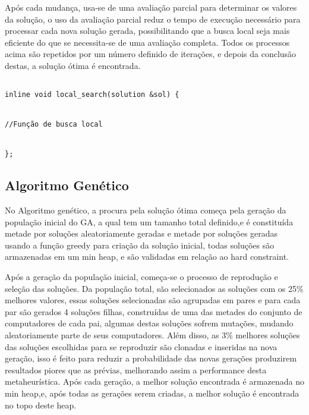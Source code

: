 \documentclass[12pt]{article}
\begin{document}
Após cada mudança, usa-se de uma avaliação parcial para determinar os valores da solução, o uso da avaliação parcial reduz o tempo de execução necessário para processar cada nova solução gerada, possibilitando que a busca local seja mais eficiente do que se necessita-se de uma avaliação completa. Todos os processos acima são repetidos por um número definido de iterações, e depois da conclusão destas, a solução ótima é encontrada.



\begin{lstlisting}

inline void local_search(solution &sol) {


//Função de busca local
 

};

\end{lstlisting}
\begingroup
{}
\endgroup




\subsection{Algoritmo Genético}


No Algoritmo genético, a procura pela solução ótima começa pela geração da população inicial do GA, a qual tem um tamanho total definido,e é constituída metade por soluções aleatoriamente geradas e metade por soluções geradas usando a função greedy para criação da solução inicial, todas soluções são armazenadas em um min heap, e são validadas em relação ao hard constraint.



Após a geração da população inicial, começa-se o processo de reprodução e seleção das soluções. Da população total, são selecionados as soluções com os 25\% melhores valores, essas soluções selecionadas são agrupadas em pares e para cada par são gerados 4 soluções filhas, construídas de uma das metades do conjunto de computadores de cada pai, algumas destas soluções sofrem mutações, mudando aleatoriamente parte de seus computadores. Além disso, as 3\% melhores soluções das soluções escolhidas para se reproduzir são clonadas e inseridas na nova geração, isso é feito para reduzir a probabilidade das novas gerações produzirem resultados piores que as prévias, melhorando assim a performance desta metaheurística. Após cada geração, a melhor solução encontrada é armazenada no min heap,e, após todas as gerações serem criadas, a melhor solução é encontrada no topo deste heap.
\end{document}
